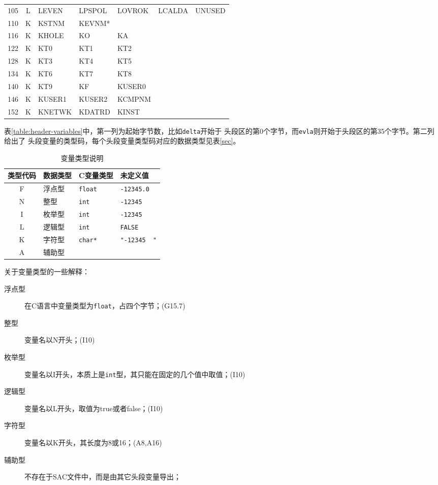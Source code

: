 \begin{table}[H]
\begin{tabular}{c|c|lllll}
	105		&	L	&	LEVEN	&	LPSPOL	&	LOVROK	&	LCALDA	&	UNUSED	\\
	110		&	K	&	KSTNM	&	KEVNM*	&			&			&			\\
	116		&	K	&	KHOLE	&	KO		&	KA		&			&			\\
	122		&	K	&	KT0		&	KT1		&	KT2		&			&			\\
	128		&	K	&	KT3		&	KT4		&	KT5		&			&			\\
	134		&	K	&	KT6		&	KT7		&	KT8		&			&			\\
	140		&	K	&	KT9		&	KF		&	KUSER0	&			&			\\
	146		&	K	&	KUSER1	&	KUSER2	&	KCMPNM	&			&			\\
	152		&	K	&	KNETWK	&	KDATRD	&	KINST	&			&			\\
    \bottomrule
\end{tabular}
\end{table}

表\ref{table:header-variables}中，第一列为起始字节数，比如\lstinline{delta}开始于
头段区的第0个字节，而\lstinline{evla}则开始于头段区的第35个字节。第二列给出了
头段变量的类型码，每个头段变量类型码对应的数据类型见表\ref{sec}。

\begin{table}[H]
\caption{变量类型说明}
\label{table:header-variables-type}
\centering
\begin{tabular}{clll}
	\toprule
    类型代码&	数据类型    &   C变量类型           	&	未定义值        \\
	\midrule
    F		&	浮点型		&   \lstinline{float}       &	\lstinline{-12345.0}        \\
    N		&	整型		&   \lstinline{int}         &	\lstinline{-12345}        \\
    I		&	枚举型		&   \lstinline{int}         &	\lstinline{-12345}	        \\
    L		&	逻辑型		&   \lstinline{int}         &	\lstinline{FALSE}	        \\
    K		&	字符型		&   \lstinline{char*}       &	\lstinline[showspaces=true]{"-12345  "}     \\
    A		&	辅助型		&                           &				    \\
	\bottomrule
\end{tabular}
\end{table}

关于变量类型的一些解释：
\begin{description}
    \item [浮点型] 在C语言中变量类型为\lstinline{float}，占四个字节；(G15.7)
    \item [整型]  变量名以N开头；(I10)
    \item [枚举型] 变量名以I开头，本质上是\lstinline{int}型，其只能在固定的几个值中取值；(I10)
    \item [逻辑型] 变量名以L开头，取值为true或者false；(I10)
    \item [字符型] 变量名以K开头，其长度为8或16；(A8,A16)
    \item [辅助型] 不存在于SAC文件中，而是由其它头段变量导出；
\end{description}

